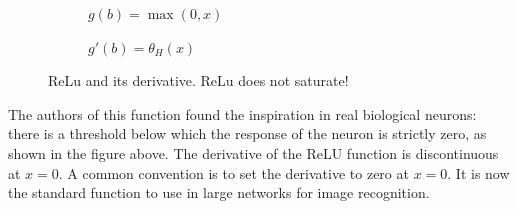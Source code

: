 \begin{figure}[h]  
	\centering 
	\begin{subfigure}[b]{0.4\linewidth}
		\caption{$ g(b)=\max(0,x) $}   
	\end{subfigure}
	\begin{subfigure}[b]{0.4\linewidth}
		\caption{$ g'(b)= \theta_H (x) $}  
	\end{subfigure}
	\vspace{10mm}
	\caption{ReLu and its derivative. ReLu does not saturate!}
\end{figure}

The authors of this function found the inspiration in real biological neurons: there is a threshold below which the response of the neuron is strictly zero, as shown in the figure above. The derivative of the ReLU function is discontinuous at $ x=0 $. A common convention is to set the derivative to zero at $ x=0 $. It is now the standard function to use in large networks for image recognition. \cite{mehlig}

\newpage

